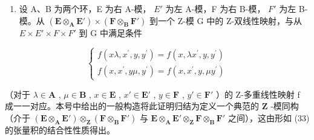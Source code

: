 \begin{enumerate}
\def\labelenumi{(\arabic{enumi})}
\setcounter{enumi}{1}
\tightlist
\item
  设 A、B 为两个环，E 为右 A-模， \(E'\) 为左 A-模，F 为右 B-模， \(F'\) 为左 B-模。从 \((\mathbf{E} \otimes_{\mathbf{A}} \mathbf{E}') \times (\mathbf{F} \otimes_{\mathbf{B}} \mathbf{F}')\) 到一个 Z-模 G 中的 Z-双线性映射，与从 \(E \times E' \times F \times F'\) 到 G 中满足条件
\end{enumerate}

\[
\left\{ \begin{array}{l} f (x \lambda , x ^ {\prime}, y, y ^ {\prime}) = f (x, \lambda x ^ {\prime}, y, y ^ {\prime}) \\ f (x, x ^ {\prime}, y \mu , y ^ {\prime}) = f (x, x ^ {\prime}, y, \mu y ^ {\prime}) \end{array} \right.\tag{38}
\]

（对于 \(\lambda\in\mathbf{A}\) , \(\mu\in\mathbf{B}\) , \(x\in\mathbf{E}\) , \(x'\in\mathbf{E}'\) , \(y\in\mathbf{F}\) , \(y'\in\mathbf{F}'\) ）的 Z-多重线性映射 f 成一一对应。本号中给出的一般构造将此证明归结为定义一个典范的 \(\mathbf{Z}\) -模同构（介于 \((\mathbf{E}\otimes_{\mathbf{A}}\mathbf{E}')\otimes_{\mathbf{Z}}(\mathbf{F}\otimes_{\mathbf{B}}\mathbf{F}')\) 与 \(\mathbf{E}\otimes_{\mathbf{A}}\mathbf{E}'\otimes_{\mathbf{Z}}\mathbf{F}\otimes_{\mathbf{B}}\mathbf{F}'\) 之间），这由形如 (33) 的张量积的结合性性质得出。

